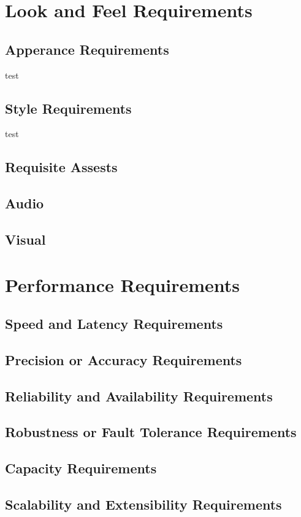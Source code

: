 \documentclass{article}
\begin{document}
\section{Look and Feel Requirements}
\subsection{Apperance Requirements}
\quad test
\subsection{Style Requirements}
\quad test
\subsection{Requisite Assests}
\subsection{Audio}
\subsection{Visual}
\section{Performance Requirements}
\subsection{Speed and Latency Requirements}
\subsection{Precision or Accuracy Requirements}
\subsection{Reliability and Availability Requirements}
\subsection{Robustness or Fault Tolerance Requirements}
\subsection{Capacity Requirements}
\subsection{Scalability and Extensibility Requirements}
\end{document}
